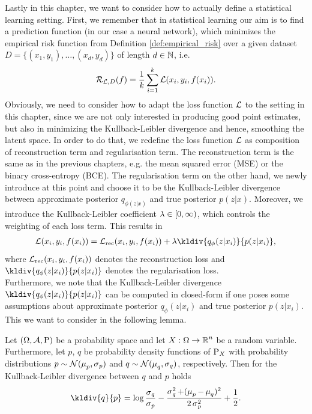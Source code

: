 Lastly in this chapter, we want to consider how to actually define a statistical learning setting. First, we remember that in statistical learning our aim is to find a prediction function (in our case a neural network), which minimizes the empirical risk function from Definition \ref{def:empirical_risk} over a given dataset $D= \{(x_1,y_1),\ldots, (x_d, y_d)\}$ of length $d\in\operatorname{\mathbb{N}}$, i.e.
\begin{align*}
\operatorname{\mathcal{R}}_{\operatorname{\mathcal{L}}, D} (f) = \frac{1}{k} \sum_{i=1}^k \operatorname{\mathcal{L}}(x_i, y_i, f(x_i)).
\end{align*}
Obviously, we need to consider how to adapt the loss function $\operatorname{\mathcal{L}}$ to the setting in this chapter, since we are not only interested in producing good point estimates, but also in minimizing the Kullback-Leibler divergence and hence, smoothing the latent space. In order to do that, we redefine the loss function $\operatorname{\mathcal{L}}$ as composition of reconstruction term and regularisation term. The reconstruction term is the same as in the previous chapters, e.g. the mean squared error (MSE) or the binary cross-entropy (BCE). The regularisation term on the other hand, we newly introduce at this point and choose it to be the Kullback-Leibler divergence between approximate posterior $q_{\phi(z|x)}$ and true posterior $p(z|x)$. Moreover, we introduce the Kullback-Leibler coefficient $\lambda\in [0,\infty)$, which controls the weighting of each loss term. This results in
\begin{align*}
\loss(x_i, y_i, f(x_i)) = \loss_{\text{rec}}(x_i, y_i, f(x_i)) + \l \kldiv{q_{\phi}(z|x_i)}{p(z|x_i)},
\end{align*}
where $\operatorname{\mathcal{L}}_{\text{rec}}(x_i, y_i, f(x_i))$ denotes the reconstruction loss and $\kldiv{q_{\phi}(z|x_i)}{p(z|x_i)}$ denotes the regularisation loss.\\
Furthermore, we note that the Kullback-Leibler divergence $\kldiv{q_{\phi}(z|x_i)}{p(z|x_i)}$ can be computed in closed-form if one poses some assumptions about approximate posterior $q_{\phi}(z|x_i)$ and true posterior $p(z|x_i)$. This we want to consider in the following lemma.

\begin{lemma}\label{lemma:kl_div}
Let $(\Omega,\operatorname{\mathcal{A}}, \operatorname{\text{P}})$ be a probability space and let $X:\Omega\to\operatorname{\mathbb{R}}^{n}$ be a random variable. Furthermore, let $p$, $q$ be probability density functions of $\operatorname{\text{P}}_X$ with probability distributions $p\sim \mathcal{N}(\operatorname{\mu}_p, \operatorname{\sigma}_p)$ and $q\sim \mathcal{N}(\operatorname{\mu}_q, \operatorname{\sigma}_q)$, respectively. Then for the Kullback-Leibler divergence between $q$ and $p$ holds
\begin{align*}
\kldiv{q}{p} = \log \frac{\s_q}{\s_p} - \frac{\s_q^2 + (\m_p - \m_q)^2}{2\s_p^2} + \frac{1}{2}.
\end{align*}
\end{lemma}

